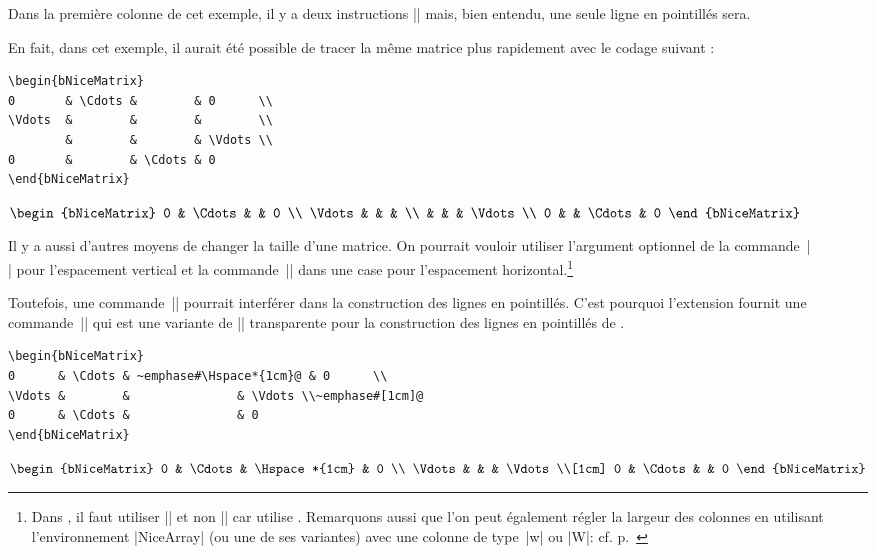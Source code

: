 \documentclass[dvipsnames]{article}%
\begin{document}
\bigskip
Dans la première colonne de cet exemple, il y a deux instructions |\Vdots| mais,
bien entendu, une seule ligne en pointillés sera.

\bigskip
En fait, dans cet exemple, il aurait été possible de tracer la même matrice plus
rapidement avec le codage suivant :\par\nobreak

\bigskip
\begin{BVerbatim}[baseline=c,boxwidth=10cm]
\begin{bNiceMatrix}
0       & \Cdots &        & 0      \\
\Vdots  &        &        &        \\
        &        &        & \Vdots \\
0       &        & \Cdots & 0 
\end{bNiceMatrix}
\end{BVerbatim}
$\begin{bNiceMatrix}
0       & \Cdots &        & 0      \\
\Vdots  &        &        &        \\
        &        &        & \Vdots \\
0       &        & \Cdots & 0 
\end{bNiceMatrix}$

\bigskip
Il y a aussi d'autres moyens de changer la taille d'une matrice. On pourrait
vouloir utiliser l'argument optionnel de la commande~|\\| pour l'espacement
vertical et la commande~|\hspace*| dans une case pour l'espacement
horizontal.\footnote{Dans , il faut utiliser |\hspace*| et non
  |\hspace| car  utilise . Remarquons aussi que l'on
  peut également régler la largeur des colonnes en utilisant l'environnement
  |{NiceArray}| (ou une de ses variantes) avec une colonne de type~|w| ou |W|:
  cf. p.~\pageref{width}}

Toutefois, une commande~|\hspace*| pourrait interférer dans la construction des
lignes en pointillés. C'est pourquoi l'extension  fournit une
commande~|\Hspace| qui est une variante de |\hspace| transparente pour la
construction des lignes en pointillés de .\par\nobreak

\bigskip
\begin{BVerbatim}[baseline=c,boxwidth=10cm]
\begin{bNiceMatrix}
0      & \Cdots & ~emphase#\Hspace*{1cm}@ & 0      \\
\Vdots &        &               & \Vdots \\~emphase#[1cm]@
0      & \Cdots &               & 0    
\end{bNiceMatrix}
\end{BVerbatim}
$\begin{bNiceMatrix}
0      & \Cdots & \Hspace*{1cm} & 0      \\
\Vdots &        &               & \Vdots \\[1cm]
0      & \Cdots &               & 0    
\end{bNiceMatrix}$
\end{document}
